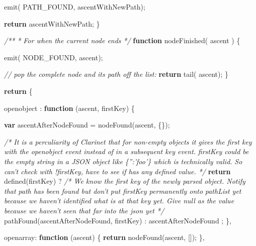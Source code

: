 \documentclass[]{article}
\newenvironment{Shaded}{}{}
\newcommand{\KeywordTok}[1]{\textcolor[rgb]{0.00,0.44,0.13}{\textbf{{#1}}}}
\newcommand{\DataTypeTok}[1]{\textcolor[rgb]{0.56,0.13,0.00}{{#1}}}
\newcommand{\CommentTok}[1]{\textcolor[rgb]{0.38,0.63,0.69}{\textit{{#1}}}}
\newcommand{\FunctionTok}[1]{\textcolor[rgb]{0.02,0.16,0.49}{{#1}}}
\newcommand{\NormalTok}[1]{{#1}}
\begin{document}
\begin{Shaded}
\begin{Highlighting}[]
      \FunctionTok{emit}\NormalTok{( PATH_FOUND, ascentWithNewPath);}
 
      \KeywordTok{return} \NormalTok{ascentWithNewPath;}
   \NormalTok{\}}


   \CommentTok{/**}
\CommentTok{    * For when the current node ends}
\CommentTok{    */}
   \KeywordTok{function} \FunctionTok{nodeFinished}\NormalTok{( ascent ) \{}

      \FunctionTok{emit}\NormalTok{( NODE_FOUND, ascent);}
                          
      \CommentTok{// pop the complete node and its path off the list:                                    }
      \KeywordTok{return} \FunctionTok{tail}\NormalTok{( ascent);}
   \NormalTok{\}      }
                 
   \KeywordTok{return} \NormalTok{\{ }

      \DataTypeTok{openobject }\NormalTok{: }\KeywordTok{function} \NormalTok{(ascent, firstKey) \{}

         \KeywordTok{var} \NormalTok{ascentAfterNodeFound = }\FunctionTok{nodeFound}\NormalTok{(ascent, \{\});         }

         \CommentTok{/* It is a perculiarity of Clarinet that for non-empty objects it}
\CommentTok{            gives the first key with the openobject event instead of}
\CommentTok{            in a subsequent key event.}
\CommentTok{                      }
\CommentTok{            firstKey could be the empty string in a JSON object like }
\CommentTok{            \{'':'foo'\} which is technically valid.}
\CommentTok{            }
\CommentTok{            So can't check with !firstKey, have to see if has any }
\CommentTok{            defined value. */}
         \KeywordTok{return} \FunctionTok{defined}\NormalTok{(firstKey)}
         \NormalTok{?          }
            \CommentTok{/* We know the first key of the newly parsed object. Notify that }
\CommentTok{               path has been found but don't put firstKey permanently onto }
\CommentTok{               pathList yet because we haven't identified what is at that key }
\CommentTok{               yet. Give null as the value because we haven't seen that far }
\CommentTok{               into the json yet */}
            \FunctionTok{pathFound}\NormalTok{(ascentAfterNodeFound, firstKey)}
         \NormalTok{:}
            \NormalTok{ascentAfterNodeFound}
         \NormalTok{;}
      \NormalTok{\},}
    
      \DataTypeTok{openarray}\NormalTok{: }\KeywordTok{function} \NormalTok{(ascent) \{}
         \KeywordTok{return} \FunctionTok{nodeFound}\NormalTok{(ascent, []);}
      \NormalTok{\},}


\end{Highlighting}
\end{Shaded}
\end{document}

